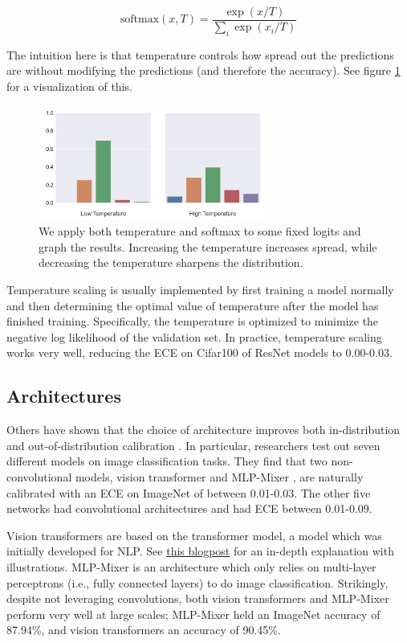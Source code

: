 \documentclass{article}
\begin{document}
\[
    \text{softmax}(x, T) = \frac{\exp(x/T)}{\sum_i \exp(x_i/T)}
\]

\noindent The intuition here is that temperature controls how spread out the predictions are without modifying the predictions (and therefore the accuracy). See figure \ref{fig:temperature} for a visualization of this.

\begin{figure} %
    \centering
\includegraphics[width=7.5cm]{images/temperature.png}
    \caption{We apply both temperature and softmax to some fixed logits and graph the results. Increasing the temperature increases spread, while decreasing the temperature sharpens the distribution.}
    \label{fig:temperature}
\end{figure}

Temperature scaling is usually implemented by first training a model normally and then determining the optimal value of temperature after the model has finished training. Specifically, the temperature is optimized to minimize the negative log likelihood of the validation set. In practice, temperature scaling works very well, reducing the ECE on Cifar100 of ResNet models to 0.00-0.03.

\subsection{Architectures}
Others have shown that the choice of architecture improves both in-distribution and out-of-distribution calibration \cite{minderer2021revisiting}. In particular, researchers test out seven different models on image classification tasks. They find that two non-convolutional models, vision transformer \cite{dosovitskiy2021image} and MLP-Mixer \cite{tolstikhin2021mlpmixer}, are naturally calibrated with an ECE on ImageNet of between 0.01-0.03. The other five networks had convolutional architectures and had ECE between 0.01-0.09.

Vision transformers are based on the transformer model, a model which was initially developed for NLP. See \href{https://jalammar.github.io/illustrated-transformer/}{\underline{this blogpost}} for an in-depth explanation with illustrations. MLP-Mixer is an architecture which only relies on multi-layer perceptrons (i.e., fully connected layers) to do image classification. Strikingly, despite not leveraging convolutions, both vision transformers and MLP-Mixer perform very well at large scales; MLP-Mixer held an ImageNet accuracy of 87.94\%, and vision transformers an accuracy of 90.45\%.
\end{document}
